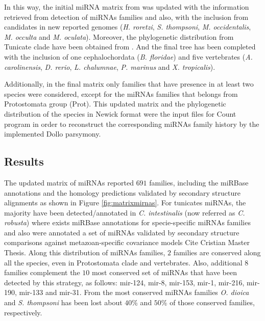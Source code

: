 \documentclass[11pt]{article}
\newcommand{\CAVH}[1]{\begingroup\color{red}#1\endgroup}
\begin{document}
In this way, the initial miRNA matrix from \cite{Hertel2015} was updated 
with the information retrieved from detection of miRNAs families and also, with 
the inclusion from candidates in new reported genomes (\textit{H. roretzi}, 
\textit{S. thompsoni}, \textit{M. occidentalis}, \textit{M. occulta} and 
\textit{M. oculata}). Moreover, the phylogenetic distribution from Tunicate 
clade have been obtained from \cite{Simion2016}. And the final tree has been 
completed with the inclusion of one cephalochordata (\textit{B. floridae}) and 
five vertebrates (\textit{A. carolinensis}, \textit{D. rerio}, \textit{L. 
chalumnae}, \textit{P. marinus} and \textit{X. tropicalis}).

Additionally, in the final matrix only families that have presence in at least 
two species were considered, except for the miRNAs families that belongs from 
Protostomata group (Prot). This updated matrix and the phylogenetic 
distribution of the species in Newick format were the input files for Count 
program \cite{Csuos2010} in order to reconstruct the corresponding miRNAs family 
history by the implemented Dollo parsymony.

\subsection*{Results}
The updated matrix of miRNAs reported $691$ families, including the miRBase 
annotations and the homology predictions validated by secondary structure 
alignments as shown in Figure \ref{fig:matrixmirnas}. For tunicates miRNAs, the
majority have been detected/annotated in \textit{C. intestinalis} (now referred 
as \textit{C. robusta}) where exists miRBase annotations for specie-specific 
miRNAs families and also were annotated a set of miRNAs validated by secondary 
structure comparisons against metazoan-specific covariance models \CAVH{Cite 
Cristian Master Thesis}. Along this distribution of miRNAs families, $2$ 
families are conserved along all the species, even in Protostomata clade and 
vertebrates. Also, additional $8$ families complement the $10$ most conserved 
set of miRNAs that have been detected by this strategy, as follows: mir-124, 
mir-8, mir-153, mir-1, mir-216, mir-190, mir-133 and mir-31. 
From the most conserved miRNAs families \textit{O. dioica} and 
\textit{S. thompsoni} has been lost about $40$\% and $50$\% of those 
conserved families, respectively. 
\end{document}
